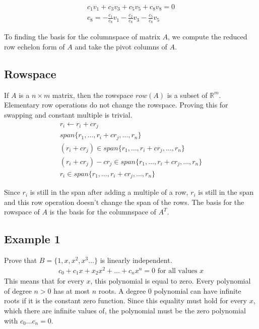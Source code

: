 \documentclass{article}
\theoremstyle{mytheoremstyle}
\theoremstyle{mytheoremstyle}
\theoremstyle{myproblemstyle}
\begin{document}
    \begin{align*}
        c_1v_1 + c_3v_3 + c_5v_5 + c_8v_8 = 0 \\
        c_8 = -\frac{c_1}{c_8} v_1 -\frac{c_2}{c_8} v_3 -\frac{c_5}{c_8} v_5
    \end{align*}

    To finding the basis for the columnspace of matrix $A$, we compute the
    reduced row echelon form of $A$ and take the pivot columns of $A$.

    \subsection*{Rowspace}
    If $A$ is a $n\times m$ matrix, then the rowspace $row(A)$ is a subset of
    $\mathbb{R}^m$. Elementary row operations do not change the rowspace.
    Proving this for swapping and constant multiple is trivial.
    \begin{align*}
        r_i \leftarrow r_i + cr_j \\
        span\{r_1,\dots,r_i+cr_j,\dots,r_n\} \\
        (r_i+cr_j) \in span\{r_1,\dots,r_i+cr_j,\dots,r_n\} \\
        (r_i+cr_j) - cr_j \in span\{r_1,\dots,r_i+cr_j,\dots,r_n\} \\
        r_i \in span\{r_1,\dots,r_i+cr_j,\dots,r_n\}
    \end{align*}

    Since $r_i$ is still in the span after adding a multiple of a row, $r_i$ is
    still in the span and this row operation doesn't change the span of the
    rows. The basis for the rowspace of $A$ is the basis for the columnspace of
    $A^T$.

    \subsection*{Example 1}
    Prove that $B=\{1,x,x^2,x^3\dots\}$ is linearly independent.
    \begin{align*}
        c_0 + c_1 x + x_2 x^2 + \dots + c_n x^n = 0 \text{ for all values } x
    \end{align*}
    This means that for every $x$, this polynomial is equal to zero. Every
    polynomial of degree $n>0$ has at most $n$ roots. A degree $0$ polynomial
    can have infinite roots if it is the constant zero function. Since this
    equality must hold for every $x$, which there are infinite values of, the
    polynomial must be the zero polynomial with $c_0\dots c_n=0$.
\end{document}
